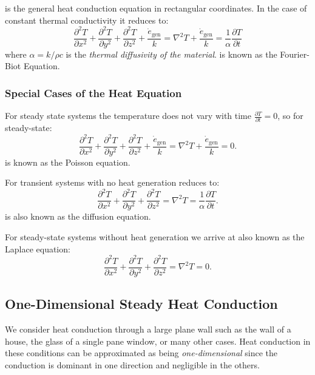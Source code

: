  is the general heat conduction equation in rectangular coordinates.
In the case of constant thermal conductivity it reduces to:
\begin{equation} \label{eq:fourierbiot}
  \frac{\partial ^2 T}{\partial x^2}  + \frac{\partial ^2 T}{\partial y^2} + \frac{\partial ^2 T}{\partial z^2} + \frac{\dot{e}_{\text{gen}}}{k} = \nabla^2 T + \frac{\dot{e}_{\text{gen}}}{k} = \frac{1}{\alpha} \frac{\partial T}{\partial t}
\end{equation}
where $\alpha = k / \rho c$ is the \textit{thermal diffusivity of the material}.
 is known as the Fourier-Biot Equation.


\subsubsection{Special Cases of the Heat Equation}
For steady state systems the temperature does not vary with time $\frac{\partial T}{\partial t}  = 0$, so for steady-state:
\begin{equation} \label{eq:poisson}
  \frac{\partial ^2 T}{\partial x^2} + \frac{\partial ^2 T}{\partial y^2}  + \frac{\partial ^2 T}{\partial z^2} + \frac{\dot{e}_{\text{gen}}}{k} = \nabla^2 T + \frac{\dot{e}_{\text{gen}}}{k} = 0 
.\end{equation}
 is known as the Poisson equation.

For transient systems with no heat generation  reduces to:
\begin{equation} \label{eq:diffusion}
  \frac{\partial ^2 T}{\partial x^2} + \frac{\partial ^2 T}{\partial y^2}  + \frac{\partial ^2 T}{\partial z^2} = \nabla^2 T = \frac{1}{\alpha} \frac{\partial T}{\partial t}
.\end{equation}
 is also known as the diffusion equation.

For steady-state systems without heat generation we arrive at  also known as the Laplace equation:
\begin{equation*} \label{eq:laplace}
  \frac{\partial ^2 T}{\partial x^2}  + \frac{\partial ^2 T}{\partial y^2}  + \frac{\partial ^2 T}{\partial z^2} = \nabla ^2 T = 0
.\end{equation*}


\subsection{One-Dimensional Steady Heat Conduction}
We consider heat conduction through a large plane wall such as the wall of a house, the glass of a single pane window, or many other cases.
Heat conduction in these conditions can be approximated as being \textit{one-dimensional} since the conduction is dominant in one direction and negligible in the others.

